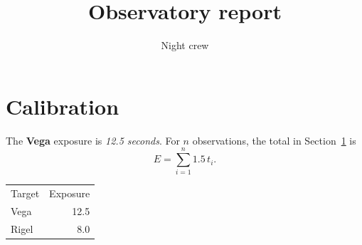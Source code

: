 \documentclass{article}
\title{Observatory report}
\author{Night crew}
\begin{document}
\maketitle
\section{Calibration}\label{sec:calibration}
The \textbf{Vega} exposure is \emph{12.5 seconds}.
For $n$ observations, the total in Section~\ref{sec:calibration} is
\begin{equation}
  E = \sum_{i=1}^{n} 1.5\,t_i.
\end{equation}
\begin{tabular}{lr}Target & Exposure \\ Vega & 12.5 \\ Rigel & 8.0\end{tabular}
\end{document}
